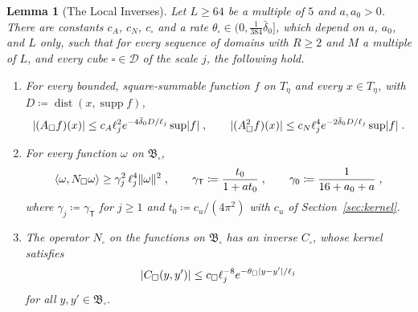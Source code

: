 \documentclass[11pt]{preprint}
\newcommand{\dist}{\operatorname{dist}}
\DeclarePairedDelimiter{\abs}{\lvert}{\rvert}
\DeclarePairedDelimiter{\norm}{\lVert}{\rVert}
\numberwithin{equation}{section}
\newtheorem{lemma}[theorem]{Lemma}
\theoremstyle{definition}
\theoremstyle{remark}
\theoremstyle{plain}
\begin{document}
\begin{lemma}[The Local Inverses]\label{lem:local-inverse}
Let $L \geq 64$ be a multiple of $5$ and $a, a_0 > 0$. There are constants $c_A$, $c_N$, $c_\square$ and a rate $\theta_\square \in (0, \frac{1}{384}\bar\delta_0]$, which depend on $a$, $a_0$, and $L$ only, such that for every sequence of domains with $R \geq 2$ and $M$ a multiple of $L$, and every cube $\square \in \mathscr D$ of the scale $j$, the following hold.
\begin{enumerate}[label=(\roman*)]
\item For every bounded, square-summable function $f$ on $T_\eta$ and every $x \in T_\eta$, with $D \coloneqq \dist(x, \operatorname{supp}f)$,
\begin{equation}\label{eq:local-square}
    \abs{(A_\square f)(x)} \leq c_A\ell_j^2e^{-4\bar\delta_0D/\ell_j}\sup\abs f\;,
    \qquad
    \abs{(A_\square^2f)(x)} \leq c_N\ell_j^4e^{-2\bar\delta_0D/\ell_j}\sup\abs f\;.
\end{equation}
\item For every function $\omega$ on $\mathfrak B_\square$,
\begin{equation}\label{eq:local-lower}
    \langle\omega, N_\square\omega\rangle \geq \gamma_j^2\,\ell_j^4\norm\omega^2\;,
    \qquad
    \gamma_{\mathsf T} \coloneqq \frac{t_0}{1 + at_0}\;,
    \qquad
    \gamma_0 \coloneqq \frac{1}{16 + a_0 + a}\;,
\end{equation}
where $\gamma_j \coloneqq \gamma_{\mathsf T}$ for $j \geq 1$ and $t_0 \coloneqq c_u/(4\pi^2)$ with $c_u$ of Section~\ref{sec:kernel}.
\item The operator $N_\square$ on the functions on $\mathfrak B_\square$ has an inverse $C_\square$, whose kernel satisfies
\begin{equation}\label{eq:local-inverse-kernel}
    \abs{C_\square(y, y')} \leq c_\square\ell_j^{-8}e^{-\theta_\square\abs{y - y'}/\ell_j}
\end{equation}
for all $y, y' \in \mathfrak B_\square$.
\end{enumerate}
\end{lemma}
\end{document}
